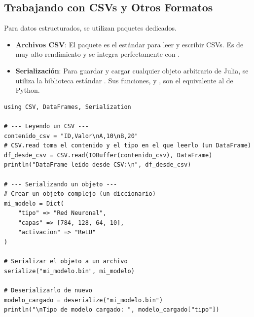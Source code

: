 \subsection*{Trabajando con CSVs y Otros Formatos}
Para datos estructurados, se utilizan paquetes dedicados.
\begin{itemize}
    \item \textbf{Archivos CSV}: El paquete \textbf{} es el estándar para leer y escribir CSVs. Es de muy alto rendimiento y se integra perfectamente con .
    \item \textbf{Serialización}: Para guardar y cargar cualquier objeto arbitrario de Julia, se utiliza la biblioteca estándar \textbf{}. Sus funciones,  y , son el equivalente al  de Python.
\end{itemize}

\begin{example}
\text{ }\begin{verbatim}
using CSV, DataFrames, Serialization

# --- Leyendo un CSV ---
contenido_csv = "ID,Valor\nA,10\nB,20"
# CSV.read toma el contenido y el tipo en el que leerlo (un DataFrame)
df_desde_csv = CSV.read(IOBuffer(contenido_csv), DataFrame)
println("DataFrame leído desde CSV:\n", df_desde_csv)

# --- Serializando un objeto ---
# Crear un objeto complejo (un diccionario)
mi_modelo = Dict(
    "tipo" => "Red Neuronal",
    "capas" => [784, 128, 64, 10],
    "activacion" => "ReLU"
)

# Serializar el objeto a un archivo
serialize("mi_modelo.bin", mi_modelo)

# Deserializarlo de nuevo
modelo_cargado = deserialize("mi_modelo.bin")
println("\nTipo de modelo cargado: ", modelo_cargado["tipo"])
\end{verbatim}
\end{example}